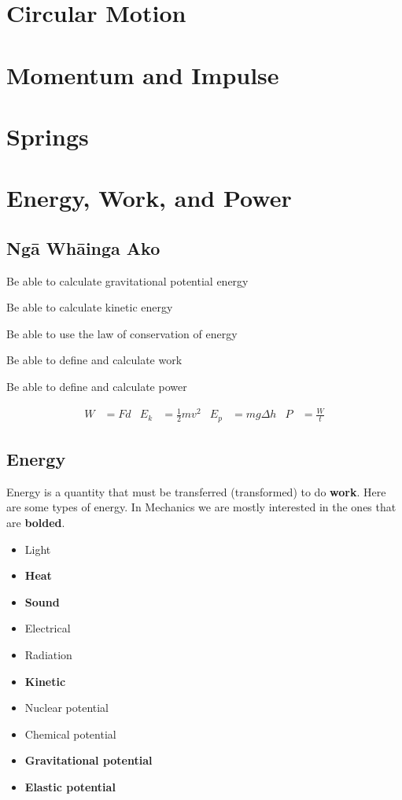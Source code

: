 \documentclass{report}
\begin{document}
\newpage
\chapter{Circular Motion}

\newpage
\chapter{Momentum and Impulse}

\newpage
\chapter{Springs}

\newpage
\chapter{Energy, Work, and Power}

\section{Ngā Whāinga Ako}

\begin{nwa}
    \item Be able to calculate gravitational potential energy
    \item Be able to calculate kinetic energy
    \item Be able to use the law of conservation of energy
    \item Be able to define and calculate work
    \item Be able to define and calculate power
\end{nwa}

\begin{align*}
	W &= Fd & E_{k} &= \frac{1}{2}mv^{2} & E_{p} &= mg\Delta h & P &= \frac{W}{t}
\end{align*}

\section{Energy}

Energy is a quantity that must be transferred (transformed) to do \textbf{work}. Here are some types of energy. In Mechanics we are mostly interested in the ones that are \textbf{bolded}.

\begin{itemize}[twocol]
	\item Light
    \item \textbf{Heat}
    \item \textbf{Sound}
    \item Electrical
    \item Radiation
    \item \textbf{Kinetic}
    \item Nuclear potential
    \item Chemical potential
    \item \textbf{Gravitational potential}
    \item \textbf{Elastic potential}
\end{itemize}
\end{document}
